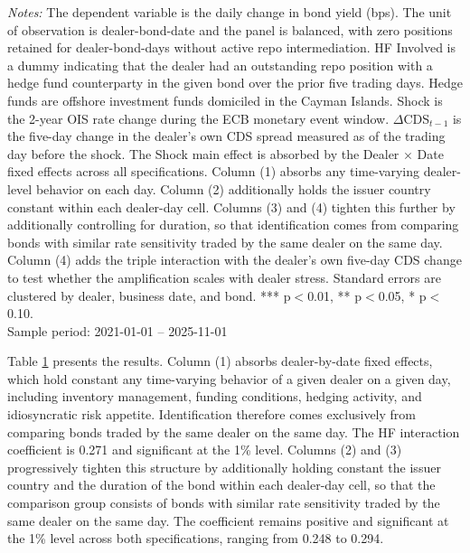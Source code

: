 \documentclass[english, 11pt, oneside]{article}
\begin{document}
\begin{table}[t]
\begin{tabular}{l c c c c}
\bottomrule
\end{tabular}
\label{tab:dealer_robustness}
\vspace{1ex}
\begin{minipage}{\textwidth}
\scriptsize
\textit{Notes:} The dependent variable is the daily change in bond yield (bps). The unit of observation is dealer-bond-date and the panel is balanced, with zero positions retained for dealer-bond-days without active repo intermediation. HF Involved is a dummy indicating that the dealer had an outstanding repo position with a hedge fund counterparty in the given bond over the prior five trading days. Hedge funds are offshore investment funds domiciled in the Cayman Islands. Shock is the 2-year OIS rate change during the ECB monetary event window. $\Delta$CDS$_{t-1}$ is the five-day change in the dealer's own CDS spread measured as of the trading day before the shock. The Shock main effect is absorbed by the Dealer $\times$ Date fixed effects across all specifications. Column (1) absorbs any time-varying dealer-level behavior on each day. Column (2) additionally holds the issuer country constant within each dealer-day cell. Columns (3) and (4) tighten this further by additionally controlling for duration, so that identification comes from comparing bonds with similar rate sensitivity traded by the same dealer on the same day. Column (4) adds the triple interaction with the dealer's own five-day CDS change to test whether the amplification scales with dealer stress. Standard errors are clustered by dealer, business date, and bond. *** p$<$0.01, ** p$<$0.05, * p$<$0.10. \\ Sample period: 2021-01-01 -- 2025-11-01
\end{minipage}
\end{table}

Table \ref{tab:dealer_robustness} presents the results. Column (1) absorbs dealer-by-date fixed effects, which hold constant any time-varying behavior of a given dealer on a given day, including inventory management, funding conditions, hedging activity, and idiosyncratic risk appetite. Identification therefore comes exclusively from comparing bonds traded by the same dealer on the same day. The HF interaction coefficient is 0.271 and significant at the 1\% level. Columns (2) and (3) progressively tighten this structure by additionally holding constant the issuer country and the duration of the bond within each dealer-day cell, so that the comparison group consists of bonds with similar rate sensitivity traded by the same dealer on the same day. The coefficient remains positive and significant at the 1\% level across both specifications, ranging from 0.248 to 0.294.
\end{document}
